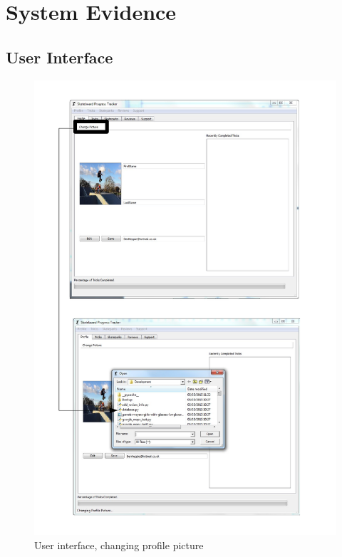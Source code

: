 \section{System Evidence}

\subsection{User Interface}

\begin{figure}[H]
    \includegraphics[width=\textwidth]{./Maintenance/Figures/ChangePicture.pdf}
    \caption{User interface, changing profile picture} \label{fig:Changing Picture UI}
\end{figure}



